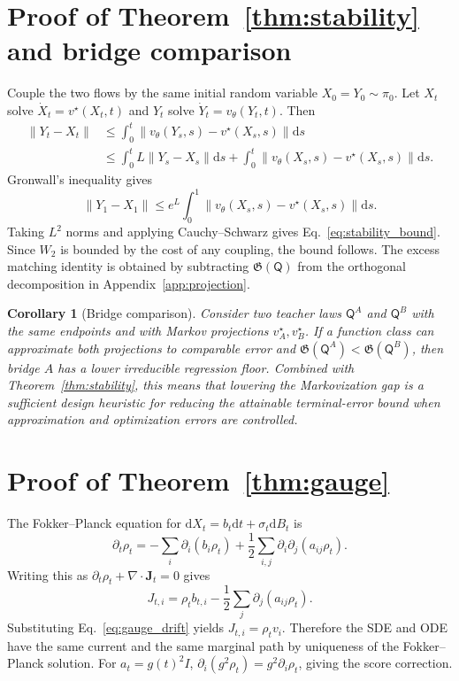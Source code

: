 \documentclass{article}
\newtheorem{corollary}{Corollary}
\numberwithin{equation}{section}
\newcommand{\dd}{\mathrm{d}}
\newcommand{\pbase}{\pi_0}
\newcommand{\scrQ}{\mathsf{Q}}
\newcommand{\J}{\bm J}
\begin{document}
\section{Proof of Theorem~\ref{thm:stability} and bridge comparison}
\label{app:stability}

Couple the two flows by the same initial random variable $X_0=Y_0\sim\pbase$. Let $X_t$ solve $\dot X_t=v^\star(X_t,t)$ and $Y_t$ solve $\dot Y_t=v_\theta(Y_t,t)$. Then
\begin{align}
\|Y_t-X_t\|&\le\int_0^t\|v_\theta(Y_s,s)-v^\star(X_s,s)\|\dd s\\
&\le\int_0^t L\|Y_s-X_s\|\dd s+
\int_0^t\|v_\theta(X_s,s)-v^\star(X_s,s)\|\dd s.
\end{align}
Gronwall's inequality gives
\begin{equation}
\|Y_1-X_1\|\le e^L\int_0^1\|v_\theta(X_s,s)-v^\star(X_s,s)\|\dd s.
\end{equation}
Taking $L^2$ norms and applying Cauchy--Schwarz gives Eq.~\eqref{eq:stability_bound}. Since $W_2$ is bounded by the cost of any coupling, the bound follows. The excess matching identity is obtained by subtracting $\mathfrak G(\scrQ)$ from the orthogonal decomposition in Appendix~\ref{app:projection}.

\begin{corollary}[Bridge comparison]
\label{cor:bridge}
Consider two teacher laws $\scrQ^A$ and $\scrQ^B$ with the same endpoints and with Markov projections $v_A^\star,v_B^\star$. If a function class can approximate both projections to comparable error and $\mathfrak G(\scrQ^A)<\mathfrak G(\scrQ^B)$, then bridge $A$ has a lower irreducible regression floor. Combined with Theorem~\ref{thm:stability}, this means that lowering the Markovization gap is a sufficient design heuristic for reducing the attainable terminal-error bound when approximation and optimization errors are controlled.
\end{corollary}

\section{Proof of Theorem~\ref{thm:gauge}}
\label{app:gauge}

The Fokker--Planck equation for $\dd X_t=b_t\dd t+\sigma_t\dd B_t$ is
\begin{equation}
    \partial_t\rho_t=-\sum_i\partial_i(b_i\rho_t)+\frac12\sum_{i,j}\partial_i\partial_j(a_{ij}\rho_t).
\end{equation}
Writing this as $\partial_t\rho_t+\nabla\cdot\J_t=0$ gives
\begin{equation}
    J_{t,i}=\rho_t b_{t,i}-\frac12\sum_j\partial_j(a_{ij}\rho_t).
\end{equation}
Substituting Eq.~\eqref{eq:gauge_drift} yields $J_{t,i}=\rho_t v_i$. Therefore the SDE and ODE have the same current and the same marginal path by uniqueness of the Fokker--Planck solution. For $a_t=g(t)^2I$, $\partial_i(g^2\rho_t)=g^2\partial_i\rho_t$, giving the score correction.
\end{document}
